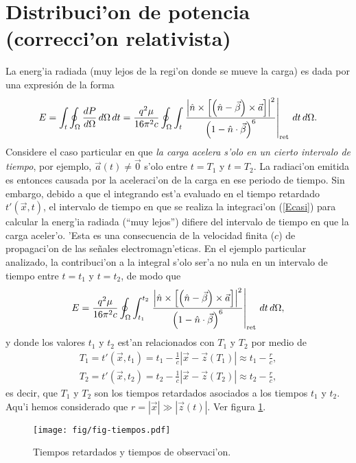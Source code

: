 
\section{Distribuci'on de potencia (correcci'on relativista)}
La energ'ia radiada (muy lejos de la regi'on donde se mueve la carga) es dada por una expresión de la forma
\begin{equation}
 E=\int_t\oint_\Omega \frac{dP}{d\Omega}\,d\Omega\,dt=\frac{q^2\mu}{16\pi^2 c}\oint_\Omega\int_t\left.\frac{\left|\hat{n}\times
\left[ \left( \hat{n}-\vec{\beta}\right)\times{\vec{a}}\right]\right|^2}{\left(
1-\hat{n}\cdot\vec{\beta}\right) ^{6}}\right|_{\rm ret}\,dt\,d\Omega .
\end{equation}
Considere el caso particular en que \textit{la carga acelera s'olo en un cierto intervalo de tiempo}, por ejemplo, $\vec{a}(t)\neq\vec{0}$ s'olo entre $t=T_1$ y $t=T_2$. La radiaci'on emitida es entonces causada por la aceleraci'on de la carga en ese periodo de tiempo. Sin embargo, debido a que el integrando est'a evaluado en el tiempo retardado $t'(\vec{x},t)$, el intervalo de tiempo en que se realiza la integraci'on (\ref{Ecasi}) para calcular la energ'ia radiada  (``muy lejos'') difiere del intervalo de tiempo en que la carga aceler'o. 'Esta es una consecuencia de la velocidad finita ($c$) de propagaci'on de las señales electromagn'eticas. En el ejemplo particular analizado, la contribuci'on a la integral s'olo ser'a no nula en un intervalo de tiempo entre $t=t_1$ y $t=t_2$, de modo que
\begin{equation}
 E=\frac{q^2\mu}{16\pi^2 c}\oint_\Omega\int_{t_1}^{t_2}\left.\frac{\left|\hat{n}\times
\left[ \left( \hat{n}-\vec{\beta}\right)\times{\vec{a}}\right]\right|^2}{\left(
1-\hat{n}\cdot\vec{\beta}\right) ^{6}}\right|_{\rm ret}\,dt\,d\Omega , \label{Ecasi}
\end{equation}
y donde los valores $t_1$ y $t_2$ est'an relacionados con $T_1$ y $T_2$ por medio de
\begin{eqnarray}
T_1=t'(\vec{x},t_1)=t_1-\frac{1}{c}|\vec{x}-\vec{z}(T_1)|
\approx t_1-\frac{r}{c}, \\
T_2=t'(\vec{x},t_2)=t_2-\frac{1}{c}|\vec{x}-\vec{z}(T_2)|
\approx t_2-\frac{r}{c},
\end{eqnarray}
es decir, que $T_1$ y $T_2$ son los tiempos retardados asociados a los tiempos $t_1$ y $t_2$. Aqu'i hemos considerado que $r=|\vec{x}|\gg |\vec{z}(t)|$. Ver figura \ref{fig:tiempos}.
\begin{figure}[H]
\centerline{\texttt{[image: fig/fig-tiempos.pdf]}}
\caption{Tiempos retardados y tiempos de observaci'on.}
\label{fig:tiempos}
\end{figure}

